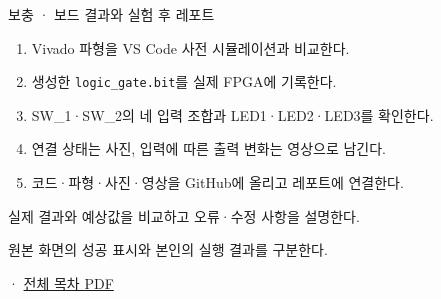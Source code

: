 \begin{frame}[label=legacy-01-postlab]{보충 · 보드 결과와 실험 후 레포트}
\small

\begin{enumerate}
\setlength{\itemsep}{0.22cm}
\item Vivado 파형을 VS Code 사전 시뮬레이션과 비교한다.
\item 생성한 \texttt{logic\_gate.bit}를 실제 FPGA에 기록한다.
\item SW\_1·SW\_2의 네 입력 조합과 LED1·LED2·LED3를 확인한다.
\item 연결 상태는 사진, 입력에 따른 출력 변화는 영상으로 남긴다.
\item 코드·파형·사진·영상을 GitHub에 올리고 레포트에 연결한다.
\end{enumerate}
\vspace{0.35cm}
실제 결과와 예상값을 비교하고 오류·수정 사항을 설명한다.\par
\vspace{0.2cm}
{\scriptsize 원본 화면의 성공 표시와 본인의 실행 결과를 구분한다.\par
{} · \href{04.LAB1_00_CONTENTS.pdf}{전체 목차 PDF}}

\end{frame}
